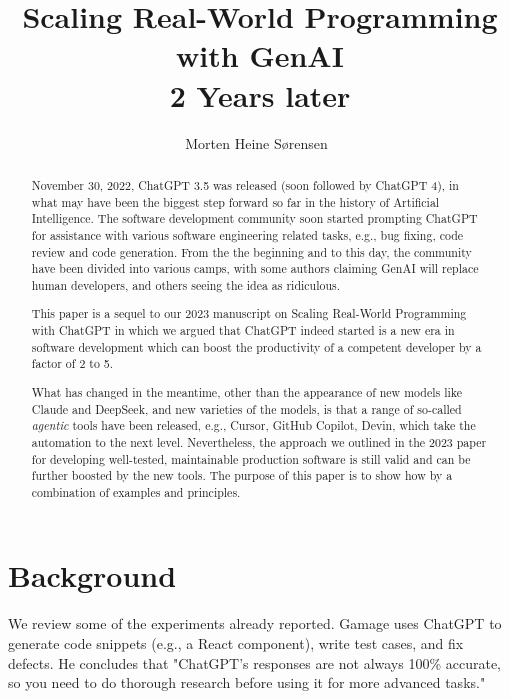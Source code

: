 \documentclass[runningheads]{llncs}
\begin{document}
\title{Scaling Real-World Programming with GenAI\\ 2 Years later}
\author{Morten Heine Sørensen\
}
\maketitle              %

\begin{abstract}
 November 30, 2022, ChatGPT 3.5 was released (soon followed by ChatGPT 4), in what may have been the biggest step forward so far in the history of Artificial Intelligence.
 The software development community soon started prompting ChatGPT for assistance with various software engineering related tasks, e.g., bug fixing, code review and code generation. From the the beginning and to this day, the community have been divided into various camps, with some authors claiming GenAI will replace human developers, and others seeing the idea as ridiculous.

 This paper is a sequel to our 2023 manuscript on Scaling Real-World Programming with ChatGPT\cite{Sorm2023} in which we argued that ChatGPT indeed started is a new era in software development which can boost the productivity of a competent developer by a factor of 2 to 5.
 
What has changed in the meantime, other than the appearance of new models like Claude and DeepSeek, and new varieties of the models, is that a range of so-called {\em agentic\/} tools have been released, e.g., Cursor, GitHub Copilot, Devin, which take the automation to the next level. Nevertheless, the approach we outlined in the 2023 paper for developing well-tested, maintainable production software is still valid and can be further boosted by the new tools. The purpose of this paper is to show how by a combination of examples and principles.

\end{abstract}
%
%
%
\section*{Background}
We review some of the experiments already reported. Gamage\cite{Gamage2023} uses ChatGPT to generate code snippets (e.g., a React component), write test cases, and fix defects. He concludes that "ChatGPT's responses are not always 100\% accurate, so you need to do thorough research before using it for more advanced tasks." 
\end{document}
